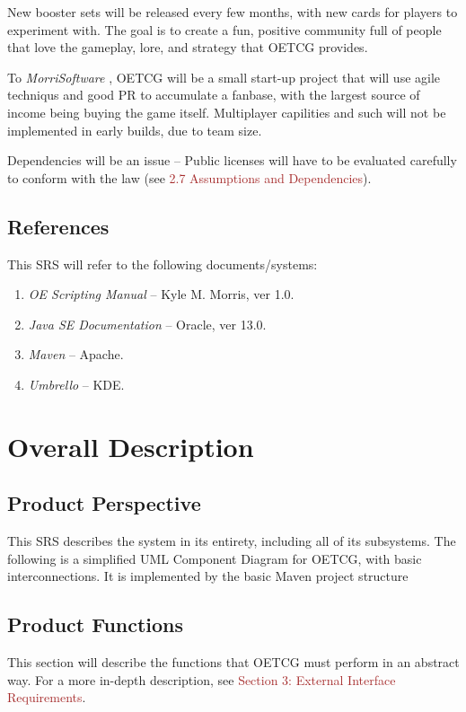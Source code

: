 \documentclass{scrreprt}
\def\orgname{\textit{MorriSoftware} }
\begin{document}
New booster sets will be released every few months, with new cards for players to experiment with. The goal is to create a fun, positive community full of people that love the gameplay, lore, and strategy that OETCG provides.

To \orgname, OETCG will be a small start-up project that will use agile techniqus and good PR to accumulate a fanbase, with the largest source of income being buying the game itself. Multiplayer capilities and such will not be implemented in early builds, due to team size.

Dependencies will be an issue -- Public licenses will have to be evaluated carefully to conform with the law (see \textcolor{brown}{2.7 Assumptions and Dependencies}).

\section{References}

This SRS will refer to the following documents/systems:
\begin{enumerate}
	\item \textit{OE Scripting Manual} -- Kyle M. Morris, ver 1.0.
	\item \textit{Java SE Documentation} -- Oracle, ver 13.0.
	\item \textit{Maven} -- Apache.
	\item \textit{Umbrello} -- KDE.
\end{enumerate}


\chapter{Overall Description}

\section{Product Perspective}
This SRS describes the system in its entirety, including all of its subsystems.
The following is a simplified UML Component Diagram for OETCG, with basic interconnections.
It is implemented by the basic Maven project structure

\section{Product Functions}
This section will describe the functions that OETCG must perform in an abstract way. For a more in-depth description, see \textcolor{brown}{Section 3: External Interface Requirements}.
\end{document}
